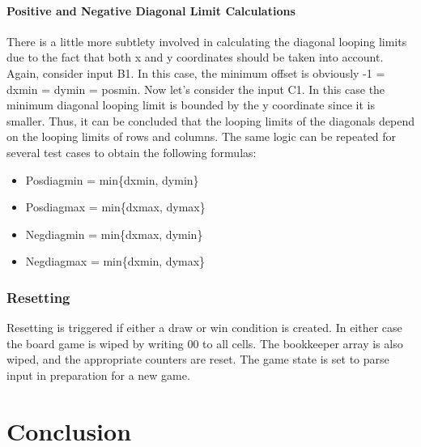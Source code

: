 \documentclass[conference]{IEEEtran}
\begin{document}
\paragraph{Positive and Negative Diagonal Limit Calculations}
There is a little more subtlety involved in calculating the diagonal looping limits due to the fact that both x and y coordinates should be taken into account. Again, consider input B1. In this case, the minimum offset is obviously  -1  = dxmin = dymin = posmin. Now let’s consider the input C1. In this case the minimum diagonal looping limit is bounded by the y coordinate since it is smaller. Thus, it can be concluded that the looping limits of the diagonals depend on the looping limits of rows and columns. The same logic can be repeated for several test cases to obtain the following formulas:
\begin{itemize}
\item Posdiagmin = min\{dxmin, dymin\}
\item Posdiagmax = min\{dxmax, dymax\}
\item Negdiagmin = min\{dxmax, dymin\}
\item Negdiagmax = min\{dxmin, dymax\}
\end{itemize} \hfill \hfill
\subsubsection{Resetting}
Resetting is triggered if either a draw or win condition is created. In either case the board game is wiped by writing 00 to all cells. The bookkeeper array is also wiped, and the appropriate counters are reset. The game state is set to parse input in preparation for a new game.
\section{Conclusion}



\end{document}
